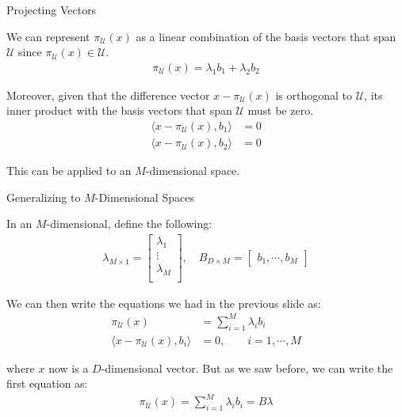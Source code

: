 \begin{frame}{Projecting Vectors}

    We can represent $\pi_{\mathcal{U}}(x)$ as a linear combination of the basis vectors that span $\mathcal{U}$ since $\pi_{\mathcal{U}}(x) \in \mathcal{U}$.
    \begin{align*}
        \pi_{\mathcal{U}}(x) = \lambda_1 b_1 + \lambda_2 b_2
    \end{align*}

    Moreover, given that the difference vector $x - \pi_{\mathcal{U}}(x)$ is orthogonal to $\mathcal{U}$, its inner product with the basis vectors that span $\mathcal{U}$ must be zero.
    \begin{align*}
        \langle x - \pi_{\mathcal{U}}(x), b_1 \rangle &= 0
        \\
        \langle x - \pi_{\mathcal{U}}(x), b_2 \rangle &= 0
    \end{align*}

    This can be applied to an $M$-dimensional space.
    
\end{frame}

\begin{frame}{Generalizing to $M$-Dimensional Spaces}

    In an $M$-dimensional, define the following:
    \begin{align*}
        \lambda_{M \times 1} =  \begin{bmatrix}
                                    \lambda_1 \\
                                    \vdots \\
                                    \lambda_M \\
                                \end{bmatrix}, \quad
                                B_{D \times M} = \begin{bmatrix} b_1, \cdots, b_M \end{bmatrix}
    \end{align*}

    We can then write the equations we had in the previous slide as:
    \begin{align*}
        \pi_{\mathcal{U}}(x) &= \sum_{i=1}^M \lambda_i b_i
        \\
        \langle x - \pi_{\mathcal{U}}(x), b_i \rangle &= 0, \qquad i=1, \cdots, M
    \end{align*}

    where $x$ now is a $D$-dimensional vector. But as we saw before, we can write the first equation as:
    \begin{align*}
        \pi_{\mathcal{U}}(x) = \sum_{i=1}^M \lambda_i b_i = B \lambda
    \end{align*}
    
\end{frame}

